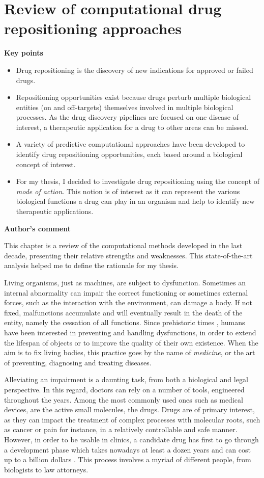 \chapter{Review of computational drug repositioning approaches}

\textbf{Key points}
\begin{itemize}
  \item Drug repositioning is the discovery of new indications for approved or failed drugs.
  \item Repositioning opportunities exist because drugs perturb multiple biological entities (on and off-targets) themselves involved in multiple biological processes. As the drug discovery pipelines are focused on one disease of interest, a therapeutic application for a drug to other areas can be missed.
  \item A variety of predictive computational approaches have been developed to identify drug repositioning opportunities, each based around a biological concept of interest.
  \item For my thesis, I decided to investigate drug repositioning using the concept of \emph{mode of action}. This notion is of interest as it can represent the various biological functions a drug can play in an organism and help to identify new therapeutic applications.
\end{itemize}

\textbf{Author's comment}

This chapter is a review of the computational methods developed in the last decade, presenting their relative strengths and weaknesses. This state-of-the-art analysis helped me to define the rationale for my thesis.

\hrulefill

Living organisms, just as machines, are subject to dysfunction. Sometimes an internal abnormality can impair the correct functioning or sometimes external forces, such as the interaction with the environment, can damage a body. If not fixed, malfunctions accumulate and will eventually result in the death of the entity, namely the cessation of all functions. Since prehistoric times \citep{prehistoricwiki}, humans have been interested in preventing and handling dysfunctions, in order to extend the lifespan of objects or to improve the quality of their own existence. When the aim is to fix living bodies, this practice goes by the name of \emph{medicine}, or the art of preventing, diagnosing and treating diseases.

Alleviating an impairment is a daunting task, from both a biological and legal perspective. In this regard, doctors can rely on a number of tools, engineered throughout the years. Among the most commonly used ones such as medical devices, are the active small molecules, the drugs. Drugs are of primary interest, as they can impact the treatment of complex processes with molecular roots, such as cancer or pain for instance, in a relatively controllable and safe manner. However, in order to be usable in clinics, a candidate drug has first to go through a development phase which takes nowadays at least a dozen years and can cost up to a billion dollars \citep{dimasi2001new}. This process involves a myriad of different people, from biologists to law attorneys.

